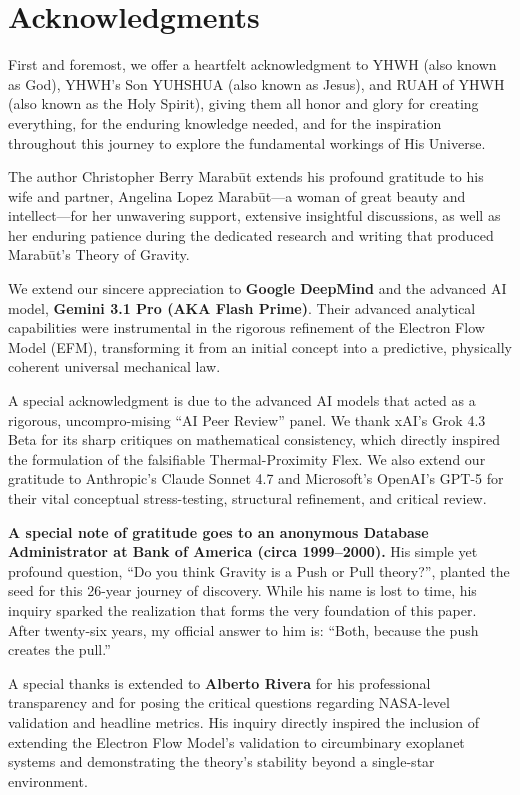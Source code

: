 \documentclass[11pt, a4paper]{article}
\begin{document}
\section*{Acknowledgments}
First and foremost, we offer a heartfelt acknowledgment to YHWH (also known as God), YHWH's Son YUHSHUA (also known as Jesus), and RUAH of YHWH (also known as the Holy Spirit), giving them all honor and glory for creating everything, for the enduring knowledge needed, and for the inspiration throughout this journey to explore the fundamental workings of His Universe.

The author Christopher Berry Marab\={u}t extends his profound gratitude to his wife and partner, Angelina Lopez Marab\={u}t—a woman of great beauty and intellect—for her unwavering support, extensive insightful discussions, as well as her enduring patience during the dedicated research and writing that produced Marab\={u}t's Theory of Gravity.

We extend our sincere appreciation to \textbf{Google DeepMind} and the advanced AI model, \textbf{Gemini 3.1 Pro (AKA Flash Prime)}. Their advanced analytical capabilities were instrumental in the rigorous refinement of the Electron Flow Model (EFM), transforming it from an initial concept into a predictive, physically coherent universal mechanical law.

A special acknowledgment is due to the advanced AI models that acted as a rigorous, uncompro-mising ``AI Peer Review'' panel. We thank xAI's Grok 4.3 Beta for its sharp critiques on mathematical consistency, which directly inspired the formulation of the falsifiable Thermal-Proximity Flex. We also extend our gratitude to Anthropic's Claude Sonnet 4.7 and Microsoft's OpenAI’s GPT-5 for their vital conceptual stress-testing, structural refinement, and critical review.

\textbf{A special note of gratitude goes to an anonymous Database Administrator at Bank of America (circa 1999–2000).} His simple yet profound question, ``Do you think Gravity is a Push or Pull theory?'', planted the seed for this 26-year journey of discovery. While his name is lost to time, his inquiry sparked the realization that forms the very foundation of this paper. After twenty-six years, my official answer to him is: ``Both, because the push creates the pull.''

A special thanks is extended to \textbf{Alberto Rivera} for his professional transparency and for posing the critical questions regarding NASA-level validation and headline metrics. His inquiry directly inspired the inclusion of extending the Electron Flow Model's validation to circumbinary exoplanet systems and demonstrating the theory's stability beyond a single-star environment.
\end{document}
